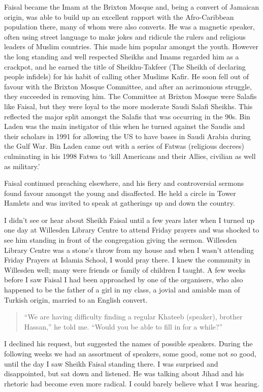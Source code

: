 \documentclass[12pt]{memoir}
\newcommand{\cor}[2]{#2} %
\begin{document}
Faisal became the Imam at the Brixton Mosque and,
being a convert of Jamaican origin,
was able to build up an excellent rapport
with the Afro-Caribbean population there, many of whom were also converts.
He was a magnetic speaker, often using street language to make jokes
and ridicule the rulers and religious leaders of Muslim countries.
This made him popular amongst the youth.
However the long standing and well respected Sheikhs and Imams
regarded him as a crackpot,
and he earned the title of Sheikhu-Takfeer
(The Sheikh of declaring people infidels)
for his habit of calling other Muslims Kafir.
He soon fell out of favour with the Brixton Mosque Committee,
and after an acrimonious struggle, they succeeded in removing him.
The Committee at Brixton Mosque were Salafis like Faisal,
but they were loyal to the more moderate Saudi Salafi Sheikhs.
This reflected the major split amongst the Salafis
that was occurring in the 90s.
Bin Laden was the main instigator of this when he turned against the Saudis
and their scholars in 1991 for allowing the US
to have bases in Saudi Arabia during the Gulf War.
Bin Laden came out with a series of Fatwas (religious decrees)
culminating in his 1998 Fatwa to
‘kill Americans and their Allies, civilian as well as military.’

Faisal continued preaching elsewhere,
and his fiery and controversial sermons found favour
amongst the young and disaffected.
He held a circle in Tower Hamlets and was invited to speak
at gatherings up and down the country.

I didn’t see or hear about Sheikh Faisal until a few years later
when I turned up one day at Willesden Library Centre to attend Friday prayers
and was shocked to see him standing in front of the congregation
giving the sermon.
Willesden Library Centre was a stone’s throw from my house
and when I wasn’t attending Friday Prayers at Islamia School,
I would pray there.
I knew the community in Willesden well;
many were friends or family of children I taught.
A few weeks before I saw Faisal I had been approached by one of the organisers,
who also happened to be the father of a girl in my class,
a jovial and amiable man of Turkish origin, married to an English convert.

\begin{quote}
“We are having difficulty finding a regular Khateeb (speaker),
brother Hassan,” he told me.
“Would you be able to fill in for a while?”
\end{quote}

I declined his request, but suggested the names of possible speakers.
During the following weeks we had an assortment of speakers, some good,
some not so good, until the day I saw \cor{Shiekh}{Sheikh} Faisal
standing there.
I was surprised and disappointed, but sat down and listened.
He was talking about Jihad and his rhetoric had become even more radical.
I could barely believe what I was hearing.
\end{document}
